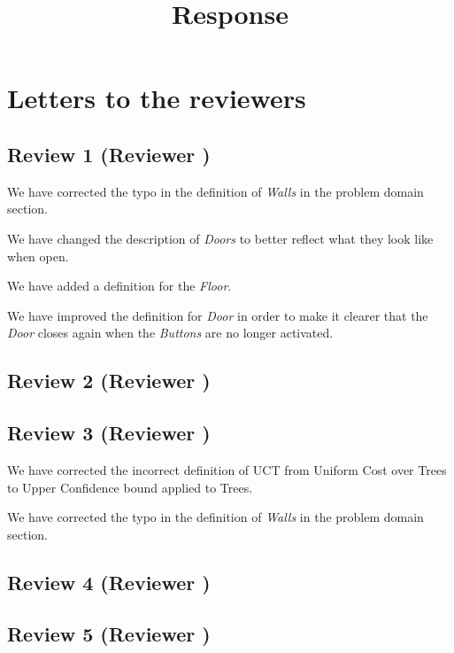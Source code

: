 \documentclass{article}
\title{Response}
\begin{document}
\maketitle
\section{Letters to the reviewers}
\subsection{Review 1 (Reviewer )}
We have corrected the typo in the definition of \emph{Walls} in the problem domain section.

We have changed the description of \emph{Doors} to better reflect what they look like when open.

We have added a definition for the \emph{Floor}.

We have improved the definition for \emph{Door} in order to make it clearer that the \emph{Door} closes again when the \emph{Buttons} are no longer activated.
\subsection{Review 2 (Reviewer )}
\subsection{Review 3 (Reviewer )}
We have corrected the incorrect definition of UCT from Uniform Cost over Trees to Upper Confidence bound applied to Trees.

We have corrected the typo in the definition of \emph{Walls} in the problem domain section.
\subsection{Review 4 (Reviewer )}
\subsection{Review 5 (Reviewer )}
\end{document}
